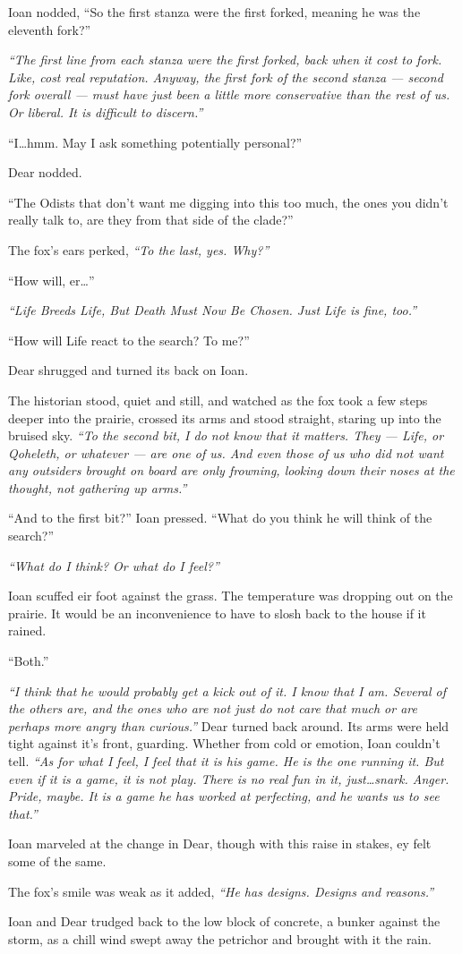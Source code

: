Ioan nodded, ``So the first stanza were the first forked, meaning he was the eleventh fork?''

\emph{``The first line from each stanza were the first forked, back when it cost to fork. Like, cost real reputation. Anyway, the first fork of the second stanza — second fork overall — must have just been a little more conservative than the rest of us. Or liberal. It is difficult to discern.''}

``I\ldots{}hmm. May I ask something potentially personal?''

Dear nodded.

``The Odists that don't want me digging into this too much, the ones you didn't really talk to, are they from that side of the clade?''

The fox's ears perked, \emph{``To the last, yes. Why?''}

``How will, er\ldots{}''

\emph{``Life Breeds Life, But Death Must Now Be Chosen. Just Life is fine, too.''}

``How will Life react to the search? To me?''

Dear shrugged and turned its back on Ioan.

The historian stood, quiet and still, and watched as the fox took a few steps deeper into the prairie, crossed its arms and stood straight, staring up into the bruised sky. \emph{``To the second bit, I do not know that it matters. They — Life, or Qoheleth, or whatever — are one of us. And even those of us who did not want any outsiders brought on board are only frowning, looking down their noses at the thought, not gathering up arms.''}

``And to the first bit?'' Ioan pressed. ``What do you think he will think of the search?''

\emph{``What do I think? Or what do I feel?''}

Ioan scuffed eir foot against the grass. The temperature was dropping out on the prairie. It would be an inconvenience to have to slosh back to the house if it rained.

``Both.''

\emph{``I think that he would probably get a kick out of it. I know that I am. Several of the others are, and the ones who are not just do not care that much or are perhaps more angry than curious.''} Dear turned back around. Its arms were held tight against it's front, guarding. Whether from cold or emotion, Ioan couldn't tell. \emph{``As for what I feel, I feel that it is his game. He is the one running it. But even if it is a game, it is not play. There is no real fun in it, just\ldots{}snark. Anger. Pride, maybe. It is a game he has worked at perfecting, and he wants us to see that.''}

Ioan marveled at the change in Dear, though with this raise in stakes, ey felt some of the same.

The fox's smile was weak as it added, \emph{``He has designs. Designs and reasons.''}

Ioan and Dear trudged back to the low block of concrete, a bunker against the storm, as a chill wind swept away the petrichor and brought with it the rain.
